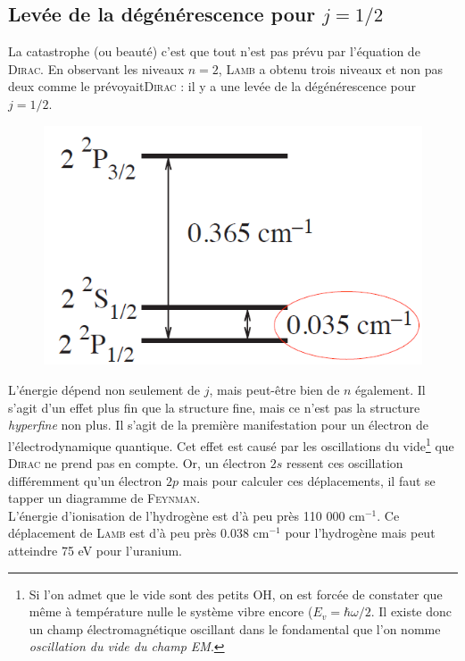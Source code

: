 \subsection{Levée de la dégénérescence pour $j=1/2$}
La catastrophe (ou beauté) c'est que tout n'est pas prévu par l'équation de \textsc{Dirac}. En 
observant les niveaux $n=2$, \textsc{Lamb} a obtenu trois niveaux et non pas deux comme le 
prévoyait\textsc{Dirac} : il y a une levée de la dégénérescence pour $j=1/2$.\\

	\begin{figure}
	\vspace{-5mm}
	\includegraphics[scale=0.4]{ch1/image10}
	\end{figure}
L'énergie dépend non seulement de $j$, mais peut-être bien de $n$ également. Il s'agit d'un effet 
plus fin que la structure fine, mais ce n'est pas la structure \textit{hyperfine} non plus. Il 
s'agit de la première manifestation pour un électron de l'électrodynamique quantique. Cet effet
est causé par les oscillations du vide\footnote{Si l'on admet que le vide sont des petits OH, on 
est forcée de constater que même à température nulle le système vibre encore ($E_v = \hbar\omega/2$.
Il existe donc un champ électromagnétique oscillant dans le fondamental que l'on nomme 
\textit{oscillation du vide du champ EM}.} que \textsc{Dirac} ne prend pas en compte. Or, un 
électron $2s$ ressent ces oscillation différemment qu'un électron $2p$ mais pour calculer ces 
déplacements, il faut se tapper un diagramme de \textsc{Feynman}.\\

L'énergie d'ionisation de l'hydrogène est d'à peu près 110 000 cm$^{-1}$. Ce déplacement de 
\textsc{Lamb} est d'à peu près 0.038 cm$^{-1}$ pour l'hydrogène mais peut atteindre 75 eV pour 
l'uranium.


